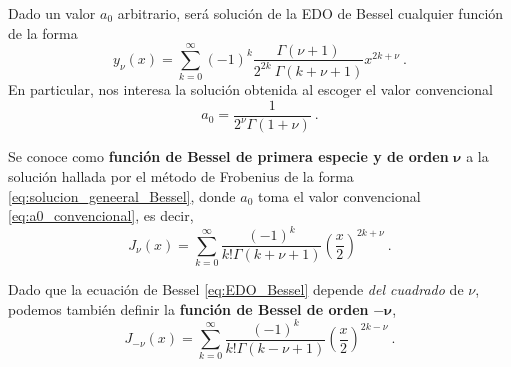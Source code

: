 Dado un valor $a_0$ arbitrario, será solución de la EDO de Bessel cualquier función de la forma
\begin{equation} \label{eq:solucion_geneeral_Bessel}
    y_\nu(x) = \sum_{k = 0}^\infty (-1)^k \frac{\Gamma(\nu + 1)}{2^{2k} \ \Gamma(k + \nu + 1)} x^{2k + \nu} \ .
\end{equation}
En particular, nos interesa la solución obtenida al escoger el valor convencional
%
%
\begin{equation} \label{eq:a0_convencional}
    a_0 = \frac{1}{2^\nu \Gamma(1+\nu)} \ .
\end{equation}
%
\begin{defi} 
    Se conoce como \textbf{función de Bessel de primera especie y de orden} $\boldsymbol{\nu}$ a la solución hallada por el método de Frobenius de la forma \eqref{eq:solucion_geneeral_Bessel}, donde $a_0$ toma el valor convencional \eqref{eq:a0_convencional}, es decir,
    \begin{equation} \label{eq:Bessel_primera_especie}
        J_\nu (x) = \sum_{k=0}^\infty \frac{(-1)^k}{k! \Gamma(k+\nu+1)} \left(\frac{x}{2}\right)^{2k+\nu} \ .
    \end{equation}

    Dado que la ecuación de Bessel \eqref{eq:EDO_Bessel} depende \emph{del cuadrado} de $\nu$, podemos también definir la \textbf{función de Bessel de orden} $\mathbf{-}\boldsymbol{\nu}$, 
    \begin{equation}
        J_{-\nu} (x) = \sum_{k=0}^\infty \frac{(-1)^k}{k! \Gamma(k-\nu+1)} \left(\frac{x}{2}\right)^{2k-\nu} \ .
    \end{equation}
\end{defi}

